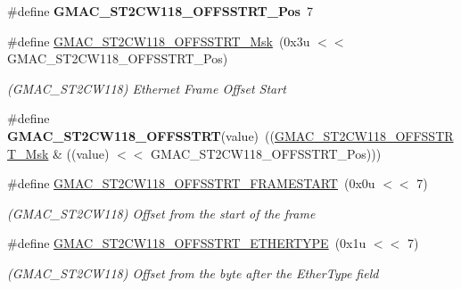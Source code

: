 \begin{DoxyCompactItemize}
\item 
\mbox{\label{group__SAMV71__GMAC_ga7eb27b6fb54f247759667399d761333d}} 
\#define {\bfseries G\+M\+A\+C\+\_\+\+S\+T2\+C\+W118\+\_\+\+O\+F\+F\+S\+S\+T\+R\+T\+\_\+\+Pos}~7
\item 
\mbox{\label{group__SAMV71__GMAC_gaefc55045aed0f9700b628c96a22d5d11}} 
\#define \mbox{\hyperlink{group__SAMV71__GMAC_gaefc55045aed0f9700b628c96a22d5d11}{G\+M\+A\+C\+\_\+\+S\+T2\+C\+W118\+\_\+\+O\+F\+F\+S\+S\+T\+R\+T\+\_\+\+Msk}}~(0x3u $<$$<$ G\+M\+A\+C\+\_\+\+S\+T2\+C\+W118\+\_\+\+O\+F\+F\+S\+S\+T\+R\+T\+\_\+\+Pos)
\begin{DoxyCompactList}\small\item\em (G\+M\+A\+C\+\_\+\+S\+T2\+C\+W118) Ethernet Frame Offset Start \end{DoxyCompactList}\item 
\mbox{\label{group__SAMV71__GMAC_ga40d3e7f5c8c7734f24f0aebb34a1caf6}} 
\#define {\bfseries G\+M\+A\+C\+\_\+\+S\+T2\+C\+W118\+\_\+\+O\+F\+F\+S\+S\+T\+RT}(value)~((\mbox{\hyperlink{group__SAMV71__GMAC_gaefc55045aed0f9700b628c96a22d5d11}{G\+M\+A\+C\+\_\+\+S\+T2\+C\+W118\+\_\+\+O\+F\+F\+S\+S\+T\+R\+T\+\_\+\+Msk}} \& ((value) $<$$<$ G\+M\+A\+C\+\_\+\+S\+T2\+C\+W118\+\_\+\+O\+F\+F\+S\+S\+T\+R\+T\+\_\+\+Pos)))
\item 
\mbox{\label{group__SAMV71__GMAC_ga1e583f64c31efe0a96d6126da510bd39}} 
\#define \mbox{\hyperlink{group__SAMV71__GMAC_ga1e583f64c31efe0a96d6126da510bd39}{G\+M\+A\+C\+\_\+\+S\+T2\+C\+W118\+\_\+\+O\+F\+F\+S\+S\+T\+R\+T\+\_\+\+F\+R\+A\+M\+E\+S\+T\+A\+RT}}~(0x0u $<$$<$ 7)
\begin{DoxyCompactList}\small\item\em (G\+M\+A\+C\+\_\+\+S\+T2\+C\+W118) Offset from the start of the frame \end{DoxyCompactList}\item 
\mbox{\label{group__SAMV71__GMAC_ga2fc365137ba5179b0bcece0d05b74384}} 
\#define \mbox{\hyperlink{group__SAMV71__GMAC_ga2fc365137ba5179b0bcece0d05b74384}{G\+M\+A\+C\+\_\+\+S\+T2\+C\+W118\+\_\+\+O\+F\+F\+S\+S\+T\+R\+T\+\_\+\+E\+T\+H\+E\+R\+T\+Y\+PE}}~(0x1u $<$$<$ 7)
\begin{DoxyCompactList}\small\item\em (G\+M\+A\+C\+\_\+\+S\+T2\+C\+W118) Offset from the byte after the Ether\+Type field \end{DoxyCompactList}\item 

\end{DoxyCompactItemize}
